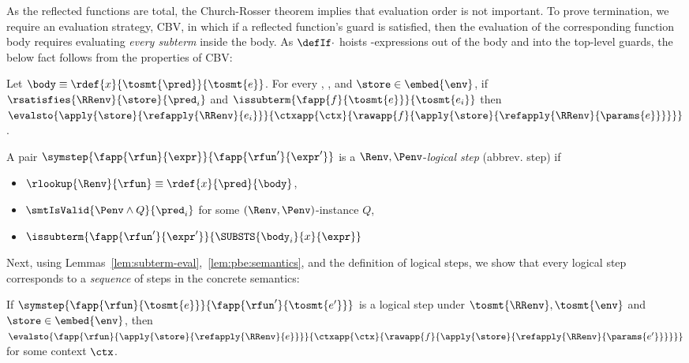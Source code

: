 %
As the reflected functions are total,
the Church-Rosser theorem implies that
evaluation order is not important.
%
To prove termination, we require
an evaluation strategy, \eg CBV,
in which if a reflected
function's guard is satisfied,
then the evaluation of the
corresponding function body
requires evaluating
\emph{every subterm}
inside the body.
%
As $\defIf\cdot$ hoists
-expressions out
of the body and into the
top-level guards, the below
fact follows from the
properties of CBV:


\begin{lemma}\label{lem:subterm-eval}
Let $\body \equiv \rdef{x}{\tosmt{\pred}}{\tosmt{e}}$.
%
For every \env, \RRenv, and $\store \in \embed{\env}$,
if $\rsatisfies{\RRenv}{\store}{\pred_i}$ and
   $\issubterm{\fapp{f}{\tosmt{e}}}{\tosmt{e_i}}$
then
   $\evalsto{{\apply{\store}{\refapply{\RRenv}{e_i}}}}{\ctxapp{\ctx}{\rawapp{f}{\apply{\store}{\refapply{\RRenv}{\params{e}}}}}}$.
\end{lemma}

%
A pair
$\symstep{\fapp{\rfun}{\expr}}{\fapp{\rfun'}{\expr'}}$
is a
$\Renv,\Penv$-\emph{logical step} (abbrev. step)
if
%
\begin{itemize}
  \item $\rlookup{\Renv}{\rfun} \equiv \rdef{x}{\pred}{\body}$,
  \item $\smtIsValid{\Penv \wedge Q}{\pred_i}$ for some $(\Renv, \Penv)$-instance $Q$,
  \item $\issubterm{\fapp{\rfun'}{\expr'}}{\SUBSTS{\body_i}{x}{\expr}}$
\end{itemize}

%
Next, using Lemmas~\ref{lem:subterm-eval},~\ref{lem:pbe:semantics},
and the definition of logical steps, we show that every
logical step corresponds to a \emph{sequence} of steps
in the concrete semantics:

\begin{lemma}\label{lem:step-reductions}
If   $\symstep{\fapp{\rfun}{\tosmt{e}}}{\fapp{\rfun'}{\tosmt{e'}}}$
     is a logical step under $\tosmt{\RRenv}, \tosmt{\env}$
		 and
		 $\store\in \embed{\env}$,
then $\evalsto{{\fapp{\rfun}{\apply{\store}{\refapply{\RRenv}{e}}}}}
              {\ctxapp{\ctx}{\rawapp{f}{\apply{\store}{\refapply{\RRenv}{\params{e'}}}}}}$
for some context $\ctx$.
\end{lemma}


